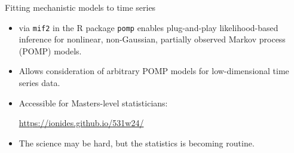 \documentclass{beamer}
\begin{document}
\begin{frame}{Fitting mechanistic models to time series}
  
    \vspace{8mm}

    \begin{itemize}
    \item  {} via \texttt{mif2} in the R package \texttt{pomp} \citep{king16} enables plug-and-play likelihood-based inference for nonlinear, non-Gaussian, partially observed Markov process (POMP) models.

      \item Allows consideration of arbitrary POMP models for low-dimensional time series data.

      \item Accessible for Masters-level statisticians:


      \vspace{2mm}

      \url{https://ionides.github.io/531w24/}

      \vspace{5mm}
      \item
      The science may be hard, but the statistics is becoming routine.


    \end{itemize}
\end{frame}
\end{document}

